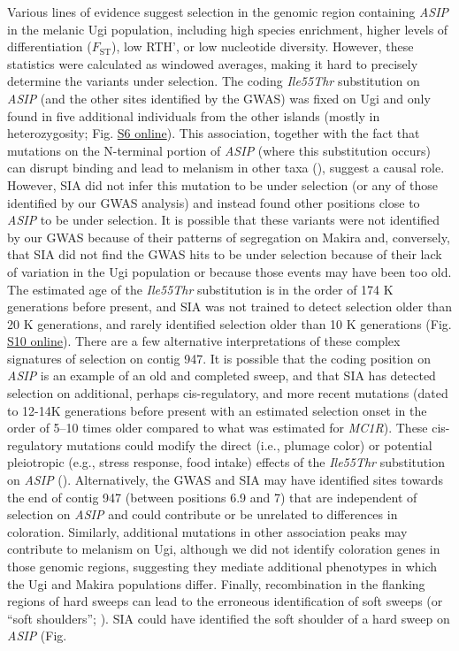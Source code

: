 Various lines of evidence suggest selection in the genomic region containing \textit{ASIP} in the melanic Ugi population, including high species enrichment, higher levels of differentiation ($F_{\mathrm{ST}}$), low \acs{RTH}’, or low nucleotide diversity. However, these statistics were calculated as windowed averages, making it hard to precisely determine the variants under selection. The coding \textit{Ile55Thr} substitution on \textit{ASIP} (and the other sites identified by the \acs{GWAS}) was fixed on Ugi and only found in five additional individuals from the other islands (mostly in heterozygosity; Fig. \href{https://journals.plos.org/PLOSGENETICS/article?id=10.1371/journal.pgen.1010474#sec017}{S6 online}). This association, together with the fact that mutations on the N-terminal portion of \textit{ASIP} (where this substitution occurs) can disrupt binding and lead to melanism in other taxa (\cite{hiragaki2008recessive,kingsley2009melanism}), suggest a causal role. However, \ac{SIA} did not infer this mutation to be under selection (or any of those identified by our \acs{GWAS} analysis) and instead found other positions close to \textit{ASIP} to be under selection. It is possible that these variants were not identified by our \acs{GWAS} because of their patterns of segregation on Makira and, conversely, that \ac{SIA} did not find the \acs{GWAS} hits to be under selection because of their lack of variation in the Ugi population or because those events may have been too old. The estimated age of the \textit{Ile55Thr} substitution is in the order of 174 K generations before present, and SIA was not trained to detect selection older than 20 K generations, and rarely identified selection older than 10 K generations (Fig. \href{https://journals.plos.org/PLOSGENETICS/article?id=10.1371/journal.pgen.1010474#sec017}{S10 online}). There are a few alternative interpretations of these complex signatures of selection on contig 947. It is possible that the coding position on \textit{ASIP} is an example of an old and completed sweep, and that \ac{SIA} has detected selection on additional, perhaps cis-regulatory, and more recent mutations (dated to 12-14K generations before present with an estimated selection onset in the order of 5–10 times older compared to what was estimated for \textit{MC1R}). These cis-regulatory mutations could modify the direct (i.e., plumage color) or potential pleiotropic (e.g., stress response, food intake) effects of the \textit{Ile55Thr} substitution on \textit{ASIP} (\cite{ducrest2008pleiotropy}). Alternatively, the \acs{GWAS} and \ac{SIA} may have identified sites towards the end of contig 947 (between positions 6.9 and 7) that are independent of selection on \textit{ASIP} and could contribute or be unrelated to differences in coloration. Similarly, additional mutations in other association peaks may contribute to melanism on Ugi, although we did not identify coloration genes in those genomic regions, suggesting they mediate additional phenotypes in which the Ugi and Makira populations differ. Finally, recombination in the flanking regions of hard sweeps can lead to the erroneous identification of soft sweeps (or “soft shoulders”; \cite{schrider2015soft}). \ac{SIA} could have identified the soft shoulder of a hard sweep on \textit{ASIP} (Fig. 